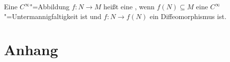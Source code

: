 \begin{definition}[{name=[Einbettung]}]
	Eine $C^\infty$"=Abbildung $f \colon N \to M$ heißt eine , wenn $f(N) \subseteq M$ eine $C^\infty$"=Untermannigfaltigkeit ist und $f \colon N \to f(N)$ ein Diffeomorphismus ist. 
\end{definition}
\cleardoubleoddemptypage
{}
\setcounter{page}{1}
\cleardoubleoddemptypage
\appendix

\section{Anhang} %
\label{sec:anhang}

\printindex
\printbibliography
\listoffigures

